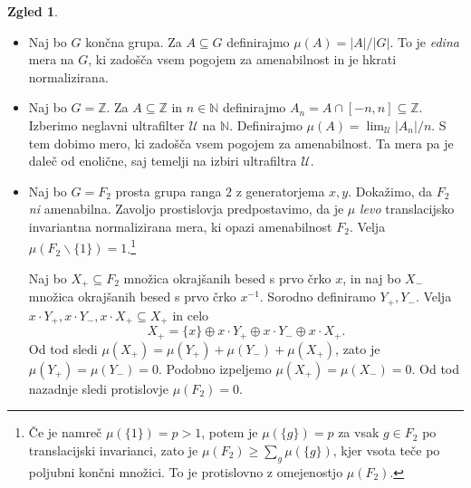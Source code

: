 \documentclass[11pt]{book}
\def\NN{\mathbb{N}}
\def\ZZ{\mathbb{Z}}
\def\UU{\mathcal{U}}
\theoremstyle{definition}
\theoremstyle{zgled}
\newtheorem*{zgled}{Zgled}
\theoremstyle{odprtproblem}
\theoremstyle{domacanaloga}
\theoremstyle{izrek}
\begin{document}
\begin{zgled}
\begin{itemize}
    \item Naj bo $G$ končna grupa. Za $A \subseteq G$ definirajmo $\mu(A) = |A|/|G|$. To je {\em edina} mera na $G$, ki zadošča vsem pogojem za amenabilnost in je hkrati normalizirana.

    \item Naj bo $G = \ZZ$. Za $A \subseteq \ZZ$ in $n \in \NN$ definirajmo $A_n = A \cap [-n, n] \subseteq \ZZ$. Izberimo neglavni ultrafilter $\UU$ na $\NN$. Definirajmo $\mu(A) = \lim_\UU |A_n|/n$. S tem dobimo mero, ki zadošča vsem pogojem za amenabilnost. Ta mera pa je daleč od enolične, saj temelji na izbiri ultrafiltra $\UU$.

    \item Naj bo $G = F_2$ prosta grupa ranga $2$ z generatorjema $x,y$. Dokažimo, da $F_2$ {\em ni} amenabilna. Zavoljo prostislovja predpostavimo, da je $\mu$ {\em levo} translacijsko invariantna normalizirana mera, ki opazi amenabilnost $F_2$. Velja $\mu(F_2 \backslash \{ 1 \}) = 1$.\footnote{Če je namreč $\mu(\{ 1 \}) = p > 1$, potem je $\mu(\{ g \}) = p$ za vsak $g \in F_2$ po translacijski invarianci, zato je $\mu(F_2) \geq \sum_g \mu(\{ g \})$, kjer vsota teče po poljubni končni množici. To je protislovno z omejenostjo $\mu(F_2)$.}

    Naj bo $X_{+} \subseteq F_2$ množica okrajšanih besed s prvo črko $x$, in naj bo $X_{-}$ množica okrajšanih besed s prvo črko $x^{-1}$. Sorodno definiramo $Y_{+}, Y_{-}$. Velja $x \cdot Y_+, x \cdot Y_-, x \cdot X_+ \subseteq X_+$ in celo
    \[
    X_+ = \{ x \} \oplus x \cdot Y_+ \oplus x \cdot Y_- \oplus x \cdot X_+.
    \]
    Od tod sledi $\mu(X_+) = \mu(Y_+) + \mu(Y_-) + \mu(X_+)$, zato je $\mu(Y_+) = \mu(Y_-) = 0$. Podobno izpeljemo $\mu(X_+) = \mu(X_-) = 0$. Od tod nazadnje sledi protislovje $\mu(F_2) = 0$.
\end{itemize}
\end{zgled}
\end{document}
